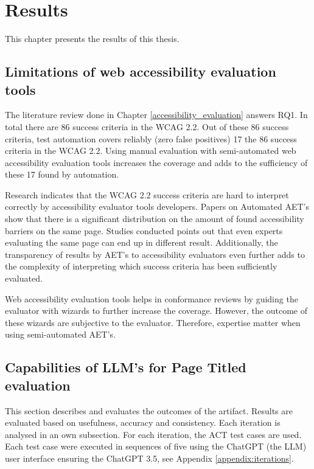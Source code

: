 \chapter{Results\label{results}}

This chapter presents the results of this thesis. 

\section{Limitations of web accessibility evaluation tools}

The literature review done in Chapter \ref{accessibility_evaluation} answers RQ1. In total there are 86 success criteria in the WCAG 2.2. Out of these 86 success criteria, test automation covers reliably (zero false positives) 17 the 86 success criteria in the WCAG 2.2. Using manual evaluation with semi-automated web accessibility evaluation tools increases the coverage and adds to the sufficiency of these 17 found by automation.

Research indicates that the WCAG 2.2 success criteria are hard to interpret correctly by accessibility evaluator tools developers. Papers on Automated AET's show that there is a significant distribution on the amount of found accessibility barriers on the same page. Studies conducted points out that even experts evaluating the same page can end up in different result. Additionally, the transparency of results by AET's to accessibility evaluators even further adds to the complexity of interpreting which success criteria has been sufficiently evaluated.

Web accessibility evaluation tools helps in conformance reviews by guiding the evaluator with wizards to further increase the coverage. However, the outcome of these wizards are subjective to the evaluator. Therefore, expertise matter when using semi-automated AET's.

\section{Capabilities of LLM's for Page Titled evaluation}

This section describes and evaluates the outcomes of the artifact. Results are evaluated based on usefulness, accuracy and consistency. Each iteration is analysed in an own subsection. For each iteration, the \textcite{act_rule_g88} ACT test cases are used. Each test case were executed in sequences of five using the ChatGPT (the LLM) user interface ensuring the ChatGPT 3.5, see Appendix \ref{appendix:iterations}.

